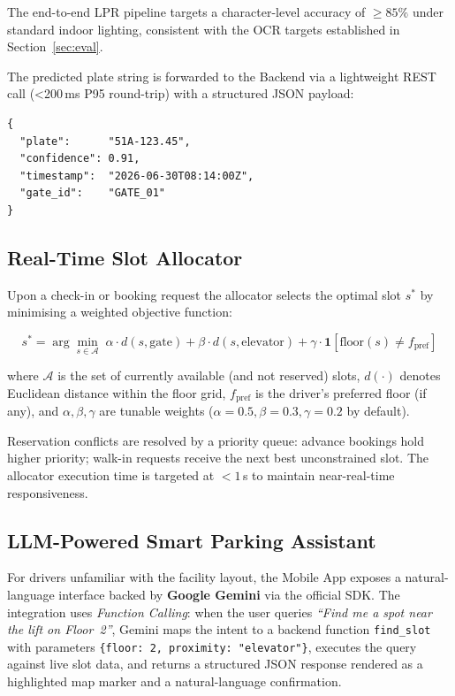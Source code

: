 \documentclass[runningheads]{llncs}
\begin{document}
The end-to-end LPR pipeline targets a character-level accuracy
of $\geq 85\%$ under standard indoor lighting, consistent with
the OCR targets established in Section~\ref{sec:eval}.

The predicted plate string is forwarded to the Backend via a
lightweight REST call (\textless 200\,ms P95 round-trip) with
a structured JSON payload:

\begin{verbatim}
{
  "plate":      "51A-123.45",
  "confidence": 0.91,
  "timestamp":  "2026-06-30T08:14:00Z",
  "gate_id":    "GATE_01"
}
\end{verbatim}

\subsection{Real-Time Slot Allocator}
\label{sec:alloc}

Upon a check-in or booking request the allocator selects the
optimal slot $s^*$ by minimising a weighted objective function:

\begin{equation}
  s^* = \arg\min_{s \in \mathcal{A}} \;
  \alpha \cdot d(s, \text{gate}) +
  \beta \cdot d(s, \text{elevator}) +
  \gamma \cdot \mathbf{1}[\text{floor}(s) \ne f_{\text{pref}}]
  \label{eq:alloc}
\end{equation}

where $\mathcal{A}$ is the set of currently available (and
not reserved) slots, $d(\cdot)$ denotes Euclidean distance
within the floor grid, $f_{\text{pref}}$ is the driver's
preferred floor (if any), and $\alpha, \beta, \gamma$ are
tunable weights ($\alpha = 0.5, \beta = 0.3, \gamma = 0.2$
by default).

Reservation conflicts are resolved by a priority queue:
advance bookings hold higher priority; walk-in requests
receive the next best unconstrained slot. The allocator
execution time is targeted at $< 1$\,s to maintain
near-real-time responsiveness.

\subsection{LLM-Powered Smart Parking Assistant}
\label{sec:llm}

For drivers unfamiliar with the facility layout, the Mobile
App exposes a natural-language interface backed by
\textbf{Google Gemini} via the official SDK. The integration
uses \emph{Function Calling}: when the user queries
\textit{``Find me a spot near the lift on Floor~2''}, Gemini
maps the intent to a backend function \texttt{find\_slot}
with parameters \texttt{\{floor: 2, proximity: "elevator"\}},
executes the query against live slot data, and returns a
structured JSON response rendered as a highlighted map marker
and a natural-language confirmation.
\end{document}
